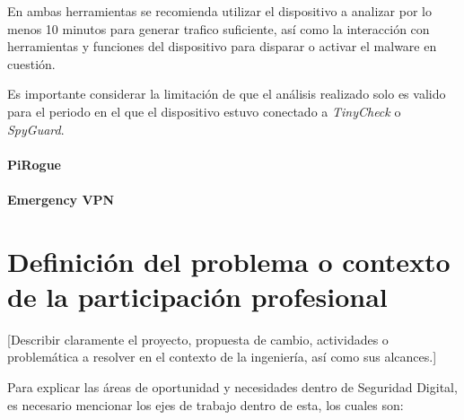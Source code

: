 \documentclass[12pt]{caltech_thesis}
\begin{document}
En ambas herramientas se recomienda utilizar el dispositivo a analizar por lo menos 10 minutos para generar trafico suficiente, así como la interacción con herramientas y funciones del dispositivo para disparar o activar el malware en cuestión.

Es importante considerar la limitación de que el análisis realizado solo es valido para el periodo en el que el dispositivo estuvo conectado a \textit{TinyCheck} o \textit{SpyGuard}.

\subsubsection{PiRogue}

\subsubsection{Emergency VPN}





\chapter{Definición del problema o contexto de la participación profesional}

[Describir claramente el proyecto, propuesta de cambio, actividades o problemática a resolver en el contexto de la ingeniería, así como sus alcances.]

Para explicar las áreas de oportunidad y necesidades dentro de Seguridad Digital, es necesario mencionar los ejes de trabajo dentro de esta, los cuales son:
\end{document}
